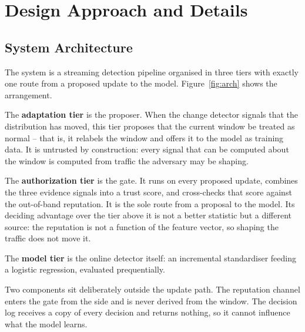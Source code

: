 \documentclass[12pt,a4paper]{report}
\begin{document}
\chapter{Design Approach and Details}

\section{System Architecture}

The system is a streaming detection pipeline organised in three tiers with
exactly one route from a proposed update to the model. Figure~\ref{fig:arch}
shows the arrangement.

The \textbf{adaptation tier} is the proposer. When the change detector signals
that the distribution has moved, this tier proposes that the current window be
treated as normal -- that is, it relabels the window and offers it to the model
as training data. It is untrusted by construction: every signal that can be
computed about the window is computed from traffic the adversary may be shaping.

The \textbf{authorization tier} is the gate. It runs on every proposed update,
combines the three evidence signals into a trust score, and cross-checks that
score against the out-of-band reputation. It is the sole route from a proposal to
the model. Its deciding advantage over the tier above it is not a better
statistic but a different source: the reputation is not a function of the feature
vector, so shaping the traffic does not move it.

The \textbf{model tier} is the online detector itself: an incremental
standardiser feeding a logistic regression, evaluated prequentially.

Two components sit deliberately outside the update path. The reputation channel
enters the gate from the side and is never derived from the window. The decision
log receives a copy of every decision and returns nothing, so it cannot influence
what the model learns.
\end{document}
